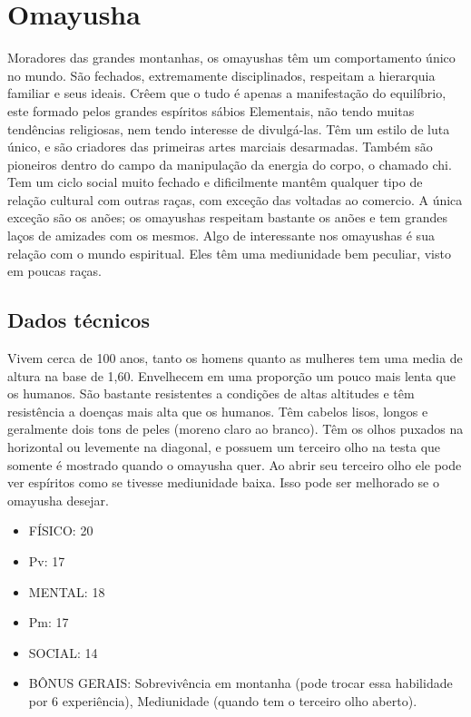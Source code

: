 \section{Omayusha}

Moradores das grandes montanhas, os omayushas têm um comportamento único no mundo. São fechados, extremamente disciplinados, respeitam a hierarquia familiar e seus ideais. Crêem que o tudo é apenas a manifestação do equilíbrio, este formado pelos grandes espíritos sábios Elementais, não tendo muitas tendências religiosas, nem tendo interesse de divulgá-las. Têm um estilo de luta único, e são criadores das primeiras artes marciais desarmadas. Também são pioneiros dentro do campo da manipulação da energia do corpo, o chamado chi.  Tem um ciclo social muito fechado e dificilmente mantêm qualquer tipo de relação cultural com outras raças, com exceção das voltadas ao comercio. A única exceção são os anões; os omayushas respeitam bastante os anões e tem grandes laços de amizades com os mesmos. Algo de interessante nos omayushas é sua relação com o mundo espiritual. Eles têm uma mediunidade bem peculiar, visto em poucas raças.

\subsection{Dados técnicos}

Vivem cerca de 100 anos, tanto os homens quanto as mulheres tem uma media de altura na base de 1,60. Envelhecem em uma proporção um pouco mais lenta que os humanos. São bastante resistentes a condições de altas altitudes e têm resistência a doenças mais alta que os humanos. Têm cabelos lisos, longos e geralmente dois tons de peles (moreno claro ao branco). Têm os olhos puxados na horizontal ou levemente na diagonal, e possuem um terceiro olho na testa que somente é mostrado quando o omayusha quer. Ao abrir seu terceiro olho ele pode ver espíritos como se tivesse mediunidade baixa. Isso pode ser melhorado se o omayusha desejar.

\begin{itemize}
	\item FÍSICO: 20
	\item Pv: 17 

	\item MENTAL: 18
	\item Pm: 17 

	\item SOCIAL: 14 

	\item BÔNUS GERAIS: Sobrevivência em montanha (pode trocar essa habilidade por 6 experiência), Mediunidade (quando tem o terceiro olho aberto).
\end{itemize}

